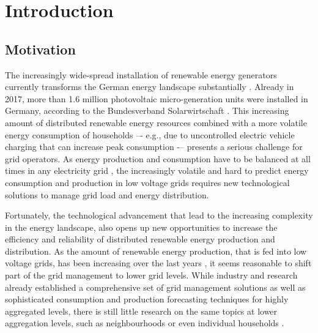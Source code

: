 
\section{Introduction}\label{Sec:Intro}




\subsection{Motivation}\label{Sec:Intro;Subsec:Motivation}

The increasingly wide-spread installation of renewable energy generators currently transforms the German energy landscape substantially \citep{Bayer:2018}. Already in 2017, more than 1.6 million photovoltaic micro-generation units were installed in Germany, according to the Bundesverband Solarwirtschaft \citep{BSW-Solar:2018}. This increasing amount of distributed renewable energy resources combined with a more volatile energy consumption of households –- e.g., due to uncontrolled electric vehicle charging that can increase peak consumption \citep{Fitzgerald:2016,Floch:2017} -– presents a serious challenge for grid operators. As energy production and consumption have to be balanced at all times in any electricity grid \citep{Weron:2006}, the increasingly volatile and hard to predict energy consumption and production in low voltage grids requires new technological solutions to manage grid load and energy distribution.

Fortunately, the technological advancement that lead to the increasing complexity in the energy landscape, also opens up new opportunities to increase the efficiency and reliability of distributed renewable energy production and distribution. As the amount of renewable energy production, that is fed into low voltage grids, has been increasing over the last years \citep{Bayer:2018}, it seems reasonable to shift part of the grid management to lower grid levels. While industry and research already established a comprehensive set of grid management solutions as well as sophisticated consumption and production forecasting techniques for highly aggregated levels, there is still little research on the same topics at lower aggregation levels, such as neighbourhoods or even individual households \citep{Meer:2018}.

